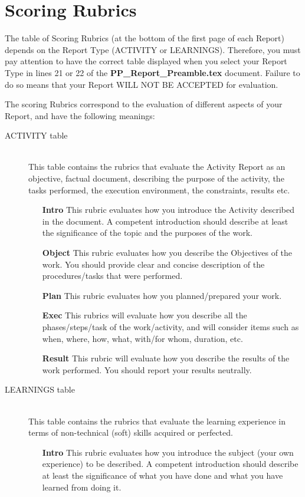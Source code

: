 \documentclass[a4paper,12pt,journal,twoside,compsoc]{PPIEEEtran}
\begin{document}
\section{Scoring Rubrics}
The table of Scoring Rubrics (at the bottom of the first page of each Report) depends on the Report Type (ACTIVITY or LEARNINGS). Therefore, you must pay attention to have the correct table displayed when you select your Report Type in lines 21 or 22 of the \textbf{PP\_Report\_Preamble.tex} document. Failure to do so means that your Report WILL NOT BE ACCEPTED for evaluation.

The scoring Rubrics correspond to the evaluation of different aspects of your Report, and have the following meanings:

\begin{description}
\item[ACTIVITY table]  \hfill \\
This table contains the rubrics that evaluate the Activity Report as an objective, factual document, describing the purpose of the activity, the tasks performed, the execution environment, the constraints, results etc. 
\begin{itemize}
\item[\textbf{Intro}] This rubric evaluates how you introduce the Activity described in the document. A competent introduction should describe at least the significance of the topic and the purposes of the work. 
\item[\textbf{Object}] This rubric evaluates how you describe the Objectives of the work. You should provide clear and concise description of the procedures/tasks that were performed.
\item[\textbf{Plan}] This rubric evaluates how you planned/prepared your work.
\item[\textbf{Exec}] This rubrics will evaluate how you describe all the phases/steps/task of the work/activity, and will consider items such as when, where, how, what, with/for whom, duration, etc.
\item[\textbf{Result}] This rubric will evaluate how you describe the results of the work performed. You should report your results neutrally.
\end{itemize}
\item[LEARNINGS table] \hfill \\
This table contains the rubrics that evaluate the learning experience in terms of non-technical (soft) skills acquired or perfected.
\begin{itemize}
\item[\textbf{Intro}] This rubric evaluates how you introduce the subject (your own experience) to be described. A competent introduction should describe at least the significance of what you have done and what you have learned from doing it.

\end{itemize}
\end{description}
\end{document}
